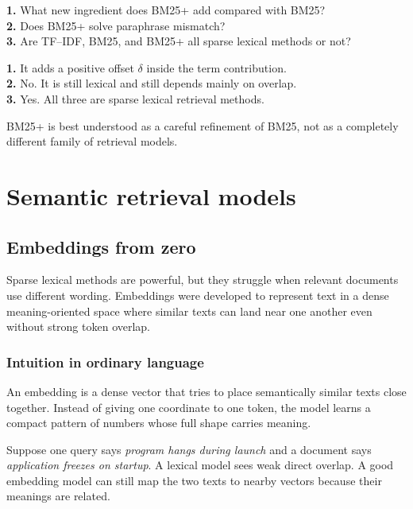 \documentclass[11pt,oneside]{report}
\begin{document}
\begin{selfcheckbox}
\textbf{1.} What new ingredient does BM25+ add compared with BM25?\\
\textbf{2.} Does BM25+ solve paraphrase mismatch?\\
\textbf{3.} Are TF--IDF, BM25, and BM25+ all sparse lexical methods or not?
\end{selfcheckbox}

\begin{answerbox}
\textbf{1.} It adds a positive offset $\delta$ inside the term contribution.\\
\textbf{2.} No. It is still lexical and still depends mainly on overlap.\\
\textbf{3.} Yes. All three are sparse lexical retrieval methods.
\end{answerbox}

\begin{rememberbox}
BM25+ is best understood as a careful refinement of BM25, not as a completely different family of retrieval models.
\end{rememberbox}


\part[Semantic Models]{Semantic retrieval models}
\chapter[Embeddings]{Embeddings from zero}

\begin{purposebox}
Sparse lexical methods are powerful, but they struggle when relevant documents use different wording. Embeddings were developed to represent text in a dense meaning-oriented space where similar texts can land near one another even without strong token overlap.
\end{purposebox}

\section*{Intuition in ordinary language}
An embedding is a dense vector that tries to place semantically similar texts close together. Instead of giving one coordinate to one token, the model learns a compact pattern of numbers whose full shape carries meaning.

\begin{examplebox}
Suppose one query says \emph{program hangs during launch} and a document says \emph{application freezes on startup}. A lexical model sees weak direct overlap. A good embedding model can still map the two texts to nearby vectors because their meanings are related.
\end{examplebox}
\end{document}

